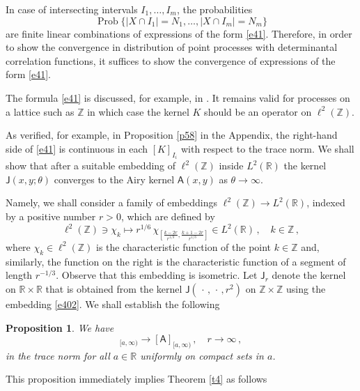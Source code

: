 \documentclass[12pt]{amsart}
\newcommand{\Prob}{\operatorname{Prob}}
\newcommand{\A}{\mathsf{A}}
\newcommand{\J}{\mathsf{J}}
\newcommand{\Z}{\mathbb{Z}}
\newcommand{\R}{\mathbb{R}}
\newcommand{\ix}{\theta}
\theoremstyle{plain}
\newtheorem{proposition}[lemma]{Proposition}
\theoremstyle{definition}
\numberwithin{equation}{section}
\begin{document}
In case of intersecting intervals $I_1,\dots,I_m$, the probabilities
$$
\Prob\{|X\cap I_1|=N_1,\dots,|X\cap I_m|=N_m \}
$$ 
are finite
linear combinations of expressions of the form \eqref{e41}. Therefore,
in order to show the convergence in distribution of point processes with determinantal 
correlation functions, it suffices to show the convergence of expressions of 
the form \eqref{e41}.

The formula \eqref{e41} is discussed, for example, in \cite{TW2}. It 
remains valid for processes on  a lattice such as $\Z$
in  which case the kernel $K$ should be an operator on $\ell^2(\Z)$. 

As verified, for example, in Proposition \ref{p58} in the Appendix, the right-hand
side of \eqref{e41} is continuous in each $[K]_{I_i}$ with respect to the trace norm.
We shall show that after a suitable embedding of $\ell^2(\Z)$ inside
$L^2(\R)$ the kernel $\J(x,y;\ix)$ converges to the Airy kernel $\A(x,y)$
as $\ix\to\infty$.  

Namely, we shall consider a family of embeddings
$\ell^2(\Z)\to L^2(\R)$,  indexed by a positive number $r>0$, which are
defined by
%
\begin{equation}\label{e402}
\ell^2(\Z)\owns\chi_k \mapsto r^{1/6} \, \chi_{\left[\frac{k-2r}{r^{1/3}},\frac{k+1-2r}{r^{1/3}}\right]}
\in L^2(\R)\,,
\quad k\in\Z\,,
\end{equation}
%
where $\chi_k\in\ell^2(\Z)$ is the characteristic function of the point
$k\in\Z$ and, similarly, the function on the right is the characteristic
function of a segment of length $r^{-1/3}$. Observe that this embedding is
isometric. Let $\J_r$ denote the kernel on $\R\times\R$ that is obtained from the
kernel $\J(\,\cdot\,,\,\cdot\,,r^2)$  on $\Z\times\Z$  using the embedding \eqref{e402}.  We shall establish
the following 

\begin{proposition}\label{p44} We have 
%
\begin{equation*}
[\J_r]_{[a,\infty)}\to[\A]_{[a,\infty)}\,, \quad r\to\infty \,,
\end{equation*}
%
in the trace norm for all $a\in\R$ uniformly on compact sets in $a$. 
\end{proposition}

This proposition immediately implies Theorem \ref{t4} as follows
\end{document}
